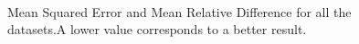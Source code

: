 \begin{figure}[h]
    \qquad
    \\
    \qquad
    \caption{Mean Squared Error and Mean Relative Difference for all the datasets.\@ A lower value corresponds to a better result.}
\end{figure}

